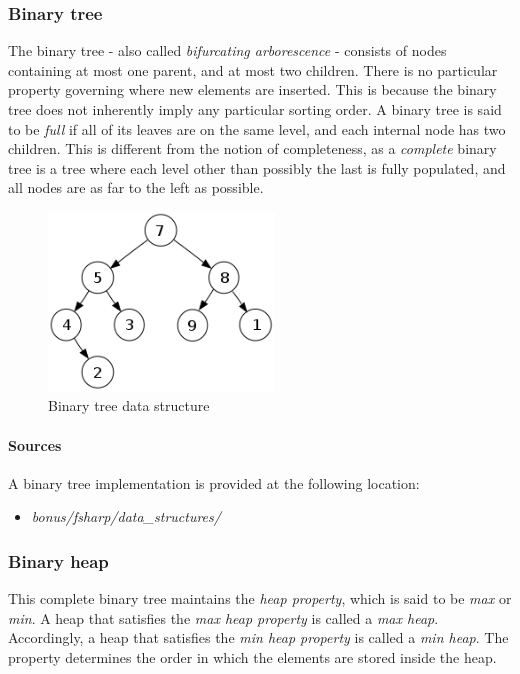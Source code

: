 \documentclass{article}
\begin{document}
\begin{samepage}
\subsubsection{Binary tree}
The binary tree - also called {\em bifurcating arborescence} - consists of nodes containing at most one parent,
and at most two children. There is no particular property governing where new elements are inserted. This is because
the binary tree does not inherently imply any particular sorting order. A binary tree is said to be {\em full} if
all of its leaves are on the same level, and each internal node has two children. This is different from the notion
of completeness, as a {\em complete} binary tree is a tree where each level other than possibly the last is fully
populated, and all nodes are as far to the left as possible.

\begin{figure}[H]
  \centering
  \includegraphics[width=6cm]{binary_tree}
  \caption{Binary tree data structure}
\end{figure}

\paragraph{Sources}
A binary tree implementation is provided at the following location:
\begin{itemize}
  
\item{{\em bonus/fsharp/data\_structures/}}
\end{itemize}
\end{samepage}


\subsubsection{Binary heap}
This complete binary tree maintains the {\em heap property}, which is said to be {\em max} or {\em min}.
A heap that satisfies the {\em max heap property} is called a {\em max heap}.
Accordingly, a heap that satisfies the {\em min heap property} is called a {\em min heap}.
The property determines the order in which the elements are stored inside the heap.
\end{document}
